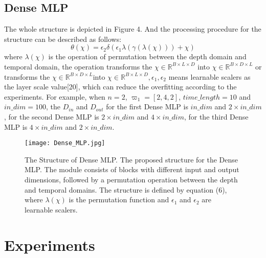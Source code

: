 \documentclass[runningheads]{llncs}
\begin{document}
\subsection{Dense MLP}
The whole structure is depicted in Figure 4. And the processing procedure for the structure can be described as follows:
\begin{equation}\label{eq5}
\theta(\chi)=\epsilon_{2}\delta(\epsilon_{1} \lambda(\gamma(\lambda(\chi)))+\chi)
\end{equation}
where $\lambda(\chi)$ is the operation of permutation between the depth domain and temporal domain, the operation transforms the $\chi\in\mathbb{R}^{B\times L \times D}$  into  $\chi\in\mathbb{R}^{B\times D \times L}$  or transforms the $\chi\in\mathbb{R}^{B\times D \times L}$into $\chi\in\mathbb{R}^{B\times L \times D}, \epsilon_{1},\epsilon_{2}$ means learnable scalers as the layer scale value[20], which can reduce the overfitting according to the experiments. For example, when $n=2$, $\varpi_1=[2,4,2]$, $time\_length=10$ and $in\_dim=100$, the $D_{in}$ and $D_{out}$ for the first Dense MLP is $in\_dim$ and $2 \times in\_dim$, for the second Dense MLP is $2 \times in\_dim$ and $4 \times in\_dim$, for the third Dense MLP is $4 \times in\_dim$ and $2 \times in\_dim$.

\begin{figure}
\centering
\texttt{[image: Dense\_MLP.jpg]}
\caption{The Structure of Dense MLP. The proposed structure for the Dense MLP. The module consists of blocks with different input and output dimensions, followed by a permutation operation between the depth and temporal domains. The structure is defined by equation (6), where $\lambda(\chi)$ is the permutation function and $\epsilon_1$ and $\epsilon_2$ are learnable scalers. } \label{fig4}
\end{figure}

\section{Experiments}
\label{sec:pagestyle}
\end{document}
